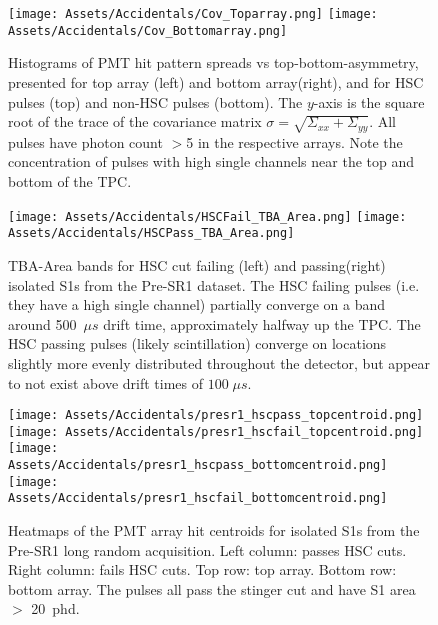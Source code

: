 \begin{figure}
    \centering
    \texttt{[image: Assets/Accidentals/Cov\_Toparray.png]}
    \texttt{[image: Assets/Accidentals/Cov\_Bottomarray.png]}
    \caption[Histograms of PMT hit pattern spreads vs top-bottom-asymmetry, presented for top array (left) and bottom array(right), and for HSC pulses (top) and non-HSC pulses (bottom).]%
    {Histograms of PMT hit pattern spreads vs top-bottom-asymmetry, presented for top array (left) and bottom array(right), and for HSC pulses (top) and non-HSC pulses (bottom).
    The $y$-axis is the square root of the trace of the covariance matrix $\sigma = \sqrt{\Sigma_{xx} + \Sigma_{yy}}$.
    All pulses have photon count $>$5 in the respective arrays.
    Note the concentration of pulses with high single channels near the top and bottom of the TPC.}
    \label{fig:cov_tba}
\end{figure}


\begin{figure}
    \centering
    \texttt{[image: Assets/Accidentals/HSCFail\_TBA\_Area.png]} 
     \texttt{[image: Assets/Accidentals/HSCPass\_TBA\_Area.png]}
    \caption[TBA-Area bands for HSC cut failing (left) and passing(right) isolated S1s from the Pre-SR1 dataset.]%
    {TBA-Area bands for HSC cut failing (left) and passing(right) isolated S1s from the Pre-SR1 dataset.
    The HSC failing pulses (i.e. they have a high single channel) partially converge on a band around 500~$\mu s$ drift time, approximately halfway up the TPC.
    The HSC passing pulses (likely scintillation) converge on locations slightly more evenly distributed throughout the detector, but appear to not exist above drift times of $100\;\mu s$.}
    \label{fig:tba_bands}
\end{figure}

\begin{figure}
    \centering
    \texttt{[image: Assets/Accidentals/presr1\_hscpass\_topcentroid.png]}
    \texttt{[image: Assets/Accidentals/presr1\_hscfail\_topcentroid.png]}\\
     \texttt{[image: Assets/Accidentals/presr1\_hscpass\_bottomcentroid.png]}
    \texttt{[image: Assets/Accidentals/presr1\_hscfail\_bottomcentroid.png]}
    \caption[Heatmaps of the PMT array hit centroids for isolated S1s from the Pre-SR1 long random acquisition. ]%
    {Heatmaps of the PMT array hit centroids for isolated S1s from the Pre-SR1 long random acquisition. 
    Left column: passes HSC cuts. Right column: fails HSC cuts.
    Top row: top array. Bottom row: bottom array.
    The pulses all pass the stinger cut and have S1 area $>$ 20~phd.
    }
    \label{fig:topcentroids_presr1}
\end{figure}
\afterpage{\FloatBarrier}
